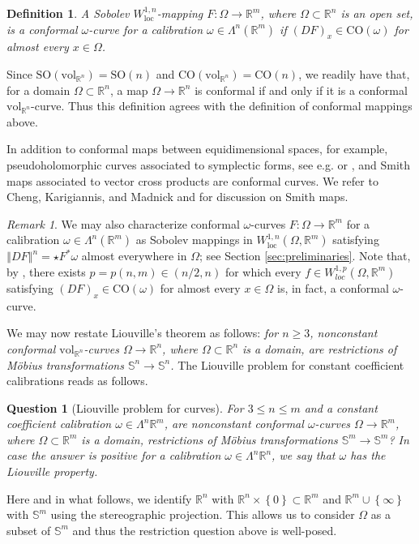 \documentclass[a4paper,leqno,11pt]{amsart}
\numberwithin{equation}{section}
\newtheorem*{definition*}{Definition}
\newtheorem*{question*}{Question}
\theoremstyle{remark}
\newtheorem*{remark*}{Remark}
\theoremstyle{remark}
\renewcommand{\S}{\mathbb{S}}
\newcommand{\R}{\mathbb{R}}
\DeclareMathOperator{\loc}{loc}
\newcommand{\norm}[1]{ \left\Vert #1 \right\Vert }	%
\newcommand{\vol}{\mathrm{vol}}
\newcommand{\bS}{\mathbb{S}}
\newcommand{\SO}{\mathrm{SO}}
\newcommand{\CO}{\mathrm{CO}}
\begin{document}
\begin{definition*}
A Sobolev $W^{1,n}_{\loc}$-mapping $F\colon \Omega \to \R^m$, where $\Omega \subset \R^n$ is an open set, is a \emph{conformal $\omega$-curve for a calibration $\omega \in \Lambda^n(\R^m)$} if $(DF)_x \in \CO(\omega)$ for almost every $x\in \Omega$.
\end{definition*}

Since $\SO(\vol_{\R^n}) = \SO(n)$ and  $\CO(\vol_{\R^n}) = \CO(n)$, we readily have that, for a domain $\Omega \subset \R^n$, a map $\Omega \to \R^n$ is conformal if and only if it is a conformal $\vol_{\R^n}$-curve. Thus this definition agrees with the definition of conformal mappings above.


In addition to conformal maps between equidimensional spaces, for example, pseudoholomorphic curves associated to symplectic forms, see e.g. \cite{Grom:85} or \cite[Chapter 2]{McD:Sal:04}, and Smith maps associated to vector cross products are conformal curves. We refer to Cheng, Karigiannis, and Madnick \cite{Che:Kari:Mad:20} and \cite{Che:Kar:Mad:23} for discussion on Smith maps. 



\begin{remark*}
We may also characterize conformal $\omega$-curves $F\colon \Omega \to \R^m$ for a calibration $\omega \in \Lambda^n(\R^m)$ as Sobolev mappings in $W^{1,n}_{\loc}(\Omega, \R^m)$ satisfying $\norm{DF}^n = \star F^*\omega$ almost everywhere in $\Omega$; see Section \ref{sec:preliminaries}. Note that, by \cite[Corollary 1.7]{Iko:24}, there exists $p = p(n,m) \in ( n/2, n )$ for which every $f \in W^{1,p}_{loc}( \Omega, \mathbb{R}^m )$ satisfying $(DF)_x \in \CO(\omega)$ for almost every $x\in \Omega$ is, in fact, a conformal $\omega$-curve.
\end{remark*}


We may now restate Liouville's theorem as follows: 
\emph{for $n\ge 3$, nonconstant conformal $\vol_{\R^n}$-curves $\Omega \to \R^n$, where $\Omega \subset \R^n$ is a domain, are restrictions of M\"obius transformations $\bS^n \to \bS^n$.} 
The Liouville problem for constant coefficient calibrations reads as follows.

\begin{question*}[Liouville problem for curves]
For $3 \le n \le m$ and a constant coefficient calibration $\omega \in \Lambda^n \R^m$, are nonconstant conformal $\omega$-curves $\Omega \to \R^m$, where $\Omega\subset \R^m$ is a domain, restrictions of M\"obius transformations $\bS^m \to \bS^m$? In case the answer is positive for a calibration $\omega \in \Lambda^n \R^n$, we say that $\omega$ has the \emph{Liouville property}.
\end{question*}
Here and in what follows, we identify $\R^n$ with $\R^n \times \left\{0\right\} \subset \R^m$ and $\R^m \cup \left\{\infty\right\}$ with $\S^m$ using the stereographic projection. This allows us to consider $\Omega$ as a subset of $\S^m$ and thus the restriction question above is well-posed.
\end{document}
